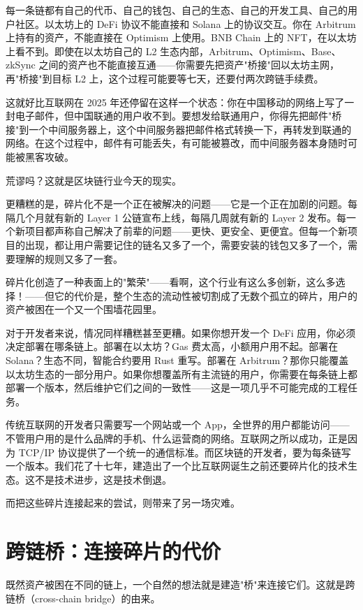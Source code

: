 \documentclass[a4paper,12pt,openany]{ctexbook}
\begin{document}
每一条链都有自己的代币、自己的钱包、自己的生态、自己的开发工具、自己的用户社区。以太坊上的 DeFi 协议不能直接和 Solana 上的协议交互。你在 Arbitrum 上持有的资产，不能直接在 Optimism 上使用。BNB Chain 上的 NFT，在以太坊上看不到。即使在以太坊自己的 L2 生态内部，Arbitrum、Optimism、Base、zkSync 之间的资产也不能直接互通——你需要先把资产"桥接"回以太坊主网，再"桥接"到目标 L2 上，这个过程可能要等七天，还要付两次跨链手续费。

这就好比互联网在 2025 年还停留在这样一个状态：你在中国移动的网络上写了一封电子邮件，但中国联通的用户收不到。要想发给联通用户，你得先把邮件"桥接"到一个中间服务器上，这个中间服务器把邮件格式转换一下，再转发到联通的网络。在这个过程中，邮件有可能丢失，有可能被篡改，而中间服务器本身随时可能被黑客攻破。

荒谬吗？这就是区块链行业今天的现实。

更糟糕的是，碎片化不是一个正在被解决的问题——它是一个正在加剧的问题。每隔几个月就有新的 Layer 1 公链宣布上线，每隔几周就有新的 Layer 2 发布。每一个新项目都声称自己解决了前辈的问题——更快、更安全、更便宜。但每一个新项目的出现，都让用户需要记住的链名又多了一个，需要安装的钱包又多了一个，需要理解的规则又多了一套。

碎片化创造了一种表面上的"繁荣"——看啊，这个行业有这么多创新，这么多选择！——但它的代价是，整个生态的流动性被切割成了无数个孤立的碎片，用户的资产被困在一个又一个围墙花园里。

对于开发者来说，情况同样糟糕甚至更糟。如果你想开发一个 DeFi 应用，你必须决定部署在哪条链上。部署在以太坊？Gas 费太高，小额用户用不起。部署在 Solana？生态不同，智能合约要用 Rust 重写。部署在 Arbitrum？那你只能覆盖以太坊生态的一部分用户。如果你想覆盖所有主流链的用户，你需要在每条链上都部署一个版本，然后维护它们之间的一致性——这是一项几乎不可能完成的工程任务。

传统互联网的开发者只需要写一个网站或一个 App，全世界的用户都能访问——不管用户用的是什么品牌的手机、什么运营商的网络。互联网之所以成功，正是因为 TCP/IP 协议提供了一个统一的通信标准。而区块链的开发者，要为每条链写一个版本。我们花了十七年，建造出了一个比互联网诞生之前还要碎片化的技术生态。这不是技术进步，这是技术倒退。

而把这些碎片连接起来的尝试，则带来了另一场灾难。


\section*{跨链桥：连接碎片的代价}


既然资产被困在不同的链上，一个自然的想法就是建造"桥"来连接它们。这就是跨链桥（cross-chain bridge）的由来。
\end{document}
